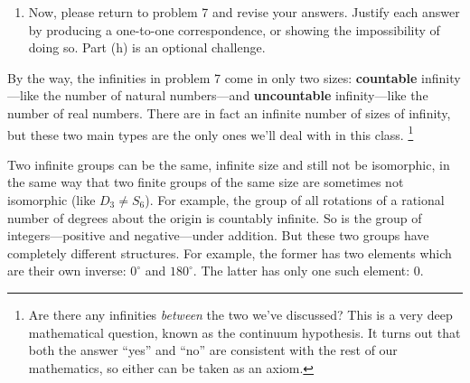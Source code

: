 \documentclass[../gatm.tex]{subfiles}
\begin{document}
\begin{enumerate}
\setcounter{enumi}{\value{inf_problem_i}}
\item Now, please return to problem 7 and revise your answers. Justify each answer by producing a one-to-one correspondence, or showing the impossibility of doing so. Part (h) is an optional challenge.
\setcounter{inf_problem_i}{\value{enumi}}
\end{enumerate}

By the way, the infinities in problem 7 come in only two sizes: \textbf{countable} infinity---like the number of natural numbers---and \textbf{uncountable} infinity---like the number of real numbers. There are in fact an infinite number of sizes of infinity, but these two main types are the only ones we'll deal with in this class. \footnote{Are there any infinities \textit{between} the two we’ve discussed? This is a very deep mathematical question, known as the continuum hypothesis. It turns out that both the answer ``yes'' and ``no'' are consistent with the rest of our mathematics, so either can be taken as an axiom.}

Two infinite groups can be the same, infinite size and still not be isomorphic, in the same way that two finite groups of the same size are sometimes not isomorphic (like $D_3\neq S_6$). For example, the group of all rotations of a rational number of degrees about the origin is countably infinite. So is the group of integers---positive and negative---under addition. But these two groups have completely different structures. For example, the former has two elements which are their own inverse: $0^\circ$ and $180^\circ$. The latter has only one such element: $0$.
\end{document}
